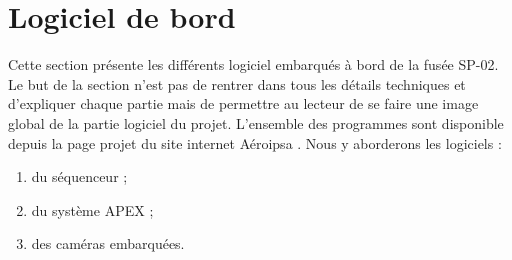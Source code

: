\section{Logiciel de bord}
\label{sec:logiciel}

Cette section présente les différents logiciel embarqués à bord de la fusée SP-02. Le but de la section n'est pas de rentrer
dans tous les détails techniques et d'expliquer chaque partie mais de permettre au lecteur de se faire une image global de la
partie logiciel du projet. L'ensemble des programmes sont disponible depuis la page projet du site internet Aéroipsa \cite{SP02}.
Nous y aborderons les logiciels :
\begin{enumerate}
    \item du séquenceur ;
    \item du système APEX ;
    \item des caméras embarquées.
\end{enumerate}






\newpage
